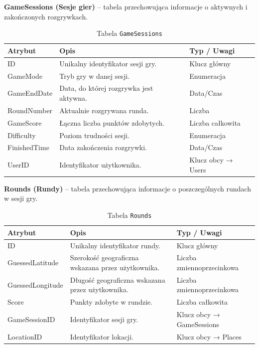 \textbf{GameSessions (Sesje gier)} – tabela przechowująca informacje o aktywnych i zakończonych rozgrywkach.

\begin{table}[H]
\centering
\renewcommand{\arraystretch}{1.2}
\begin{tabular}{|p{2.8cm}|p{8.5cm}|p{2cm}|}
\hline
\textbf{Atrybut} & \textbf{Opis} & \textbf{Typ / Uwagi} \\ \hline
ID & Unikalny identyfikator sesji gry. & Klucz główny \\ \hline
GameMode & Tryb gry w danej sesji. & Enumeracja \\ \hline
GameEndDate & Data, do której rozgrywka jest aktywna. & Data/Czas \\ \hline
RoundNumber & Aktualnie rozgrywana runda. & Liczba \\ \hline
GameScore & Łączna liczba punktów zdobytych. & Liczba całkowita \\ \hline
Difficulty & Poziom trudności sesji. & Enumeracja \\ \hline
FinishedTime & Data zakończenia rozgrywki. & Data/Czas \\ \hline
UserID & Identyfikator użytkownika. & Klucz obcy → Users \\ \hline
\end{tabular}
\caption{Tabela \texttt{GameSessions}}
\label{tab:game-sessions}
\end{table}

\textbf{Rounds (Rundy)} – tabela przechowująca informacje o poszczególnych rundach w sesji gry.

\begin{table}[H]
\centering
\renewcommand{\arraystretch}{1.2}
\begin{tabular}{|p{3cm}|p{8.5cm}|p{1.8cm}|}
\hline
\textbf{Atrybut} & \textbf{Opis} & \textbf{Typ / Uwagi} \\ \hline
ID & Unikalny identyfikator rundy. & Klucz główny \\ \hline
GuessedLatitude & Szerokość geograficzna wskazana przez użytkownika. & Liczba zmiennoprzecinkowa \\ \hline
GuessedLongitude & Długość geograficzna wskazana przez użytkownika. & Liczba zmiennoprzecinkowa \\ \hline
Score & Punkty zdobyte w rundzie. & Liczba całkowita \\ \hline
GameSessionID & Identyfikator sesji gry. & Klucz obcy → GameSessions \\ \hline
LocationID & Identyfikator lokacji. & Klucz obcy → Places \\ \hline
\end{tabular}
\caption{Tabela \texttt{Rounds}} 
\label{tab:rounds}
\end{table}


